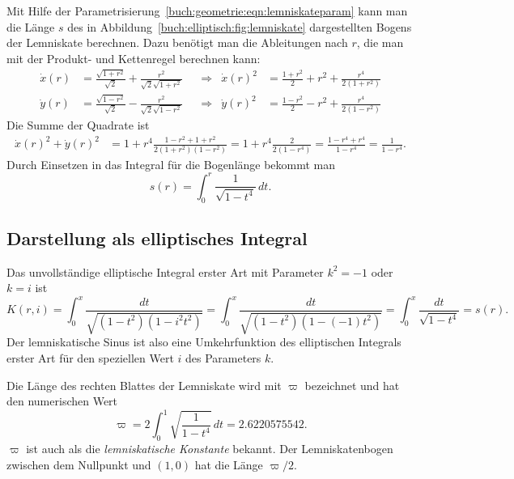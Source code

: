 Mit Hilfe der Parametrisierung~\eqref{buch:geometrie:eqn:lemniskateparam}
kann man die Länge $s$ des in Abbildung~\ref{buch:elliptisch:fig:lemniskate}
dargestellten Bogens der Lemniskate berechnen.
Dazu benötigt man die Ableitungen nach $r$, die man mit der Produkt- und
Kettenregel berechnen kann:
\begin{align*}
\dot{x}(r)
&=
\frac{\sqrt{1+r^2}}{\sqrt{2}}
+
\frac{r^2}{\sqrt{2}\sqrt{1+r^2}}
&&\Rightarrow&
\dot{x}(r)^2
&=
\frac{1+r^2}{2} +r^2 + \frac{r^4}{2(1+r^2)}
\\
\dot{y}(r)
&=
\frac{\sqrt{1-r^2}}{\sqrt{2}}
-
\frac{r^2}{\sqrt{2}\sqrt{1-r^2}}
&&\Rightarrow&
\dot{y}(r)^2
&=
\frac{1-r^2}{2} -r^2 + \frac{r^4}{2(1-r^2)}
\end{align*}
Die Summe der Quadrate ist
\begin{align*}
\dot{x}(r)^2 + \dot{y}(r)^2
&=
1 + r^4\frac{1-r^2+1+r^2}{2(1+r^2)(1-r^2)}
=
1+r^4\frac{2}{2(1-r^4)}
=
\frac{1-r^4+r^4}{1-r^4}
=
\frac1{1-r^4}.
\end{align*}
Durch Einsetzen in das Integral für die Bogenlänge bekommt man
\begin{equation}
s(r)
=
\int_0^r
\frac{1}{\sqrt{1-t^4}}\,dt.
\label{buch:elliptisch:eqn:lemniskatebogenlaenge}
\end{equation}

%
%
\subsection{Darstellung als elliptisches Integral}
Das unvollständige elliptische Integral erster Art mit Parameter
$k^2=-1$ oder $k=i$ ist
\[
K(r,i)
=
\int_0^x \frac{dt}{\sqrt{(1-t^2)(1-i^2 t^2)}}
=
\int_0^x \frac{dt}{\sqrt{(1-t^2)(1-(-1)t^2)}}
=
\int_0^x \frac{dt}{\sqrt{1-t^4}}
=
s(r).
\]
Der lemniskatische Sinus ist also eine Umkehrfunktion des
elliptischen Integrals erster Art für den speziellen Wert $i$ des
Parameters $k$.

Die Länge des rechten Blattes der Lemniskate wird mit $\varpi$ bezeichnet
und hat den numerischen Wert
\begin{equation}
\varpi
=
2\int_0^1\sqrt{\frac{1}{1-t^4}}\,dt
=
2.6220575542.
\label{buch:elliptisch:eqn:varpi}
\end{equation}
$\varpi$ ist auch als die {\em lemniskatische Konstante} bekannt.
%
Der Lemniskatenbogen zwischen dem Nullpunkt und $(1,0)$ hat die Länge
$\varpi/2$.

%
%
